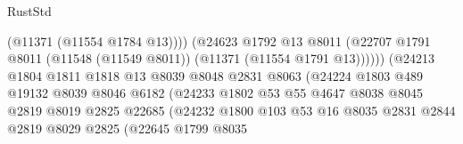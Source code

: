 \begin{lexlean}{RustStd}
\begin{coremodule}
                                              (@11371 (@11554 @1784 @13))))
                                          (@24623
                                            @1792
                                            @13
                                            @8011
                                            (@22707
                                              @1791
                                              @8011
                                              (@11548 (@11549 @8011))
                                              (@11371 (@11554 @1791 @13))))))
                                      (@24213
                                        @1804
                                        @1811
                                        @1818
                                        @13
                                        @8039
                                        @8048
                                        @2831
                                        @8063
                                        (@24224
                                          @1803
                                          @489
                                          @19132
                                          @8039
                                          @8046
                                          @6182
                                          (@24233
                                            @1802
                                            @53
                                            @55
                                            @4647
                                            @8038
                                            @8045
                                            @2819
                                            @8019
                                            @2825
                                            @22685
                                            (@24232
                                              @1800
                                              @103
                                              @53
                                              @16
                                              @8035
                                              @2831
                                              @2844
                                              @2819
                                              @8029
                                              @2825
                                              (@22645
                                                @1799
                                                @8035

\end{coremodule}
\end{lexlean}
